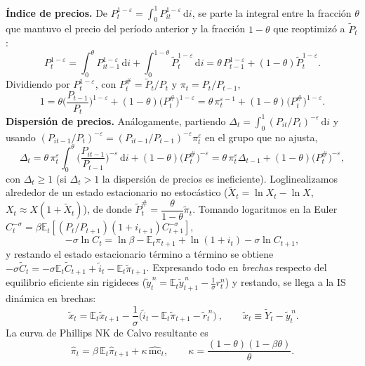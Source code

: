 \documentclass[11pt]{article}
\renewcommand{\boxed}[1]{#1}     %
\theoremstyle{definition}
\newcommand{\E}{\mathbb{E}}
\newcommand{\dd}{\,\mathrm{d}}
\newcommand{\mc}{\mathrm{mc}}
\begin{document}
\textbf{Índice de precios.} De $P_{t}^{1-\varepsilon}=\int_{0}^{1}P_{it}^{1-\varepsilon}\dd i$, se parte la
integral entre la fracción $\theta$ que mantuvo el precio del período anterior y la fracción $1-\theta$
que reoptimizó a $\widetilde{P}_{t}$:
\begin{equation}
P_{t}^{1-\varepsilon}=\int_{0}^{\theta}P_{it-1}^{1-\varepsilon}\dd i+\int_{0}^{1-\theta}\widetilde{P}_{t}^{1-\varepsilon}\dd i
=\theta\,P_{t-1}^{1-\varepsilon}+(1-\theta)\widetilde{P}_{t}^{1-\varepsilon}.
\end{equation}
Dividiendo por $P_{t}^{1-\varepsilon}$, con $P_{t}^{\#}=\widetilde{P}_{t}/P_{t}$ y $\pi_{t}=P_{t}/P_{t-1}$,
\begin{equation}
1=\theta\Big(\frac{P_{t-1}}{P_{t}}\Big)^{1-\varepsilon}+(1-\theta)\big(P_{t}^{\#}\big)^{1-\varepsilon}
=\theta\,\pi_{t}^{\varepsilon-1}+(1-\theta)\big(P_{t}^{\#}\big)^{1-\varepsilon}.
\end{equation}
\textbf{Dispersión de precios.} Análogamente, partiendo
$\Delta_{t}=\int_{0}^{1}(P_{it}/P_{t})^{-\varepsilon}\dd i$ y usando
$(P_{it-1}/P_{t})^{-\varepsilon}=(P_{it-1}/P_{t-1})^{-\varepsilon}\pi_{t}^{\varepsilon}$ en el grupo que no ajusta,
\begin{equation}
\Delta_{t}=\theta\,\pi_{t}^{\varepsilon}\!\int_{0}^{\theta}\Big(\frac{P_{it-1}}{P_{t-1}}\Big)^{-\varepsilon}\dd i
+(1-\theta)\big(P_{t}^{\#}\big)^{-\varepsilon}
=\theta\,\pi_{t}^{\varepsilon}\Delta_{t-1}+(1-\theta)\big(P_{t}^{\#}\big)^{-\varepsilon},
\end{equation}
con $\Delta_{t}\ge1$ (si $\Delta_{t}>1$ la dispersión de precios es ineficiente).
Loglinealizamos alrededor de un estado estacionario no estocástico
($\widetilde{X}_{t}=\ln X_{t}-\ln X$, $X_{t}\approx X(1+\widetilde{X}_{t})$), de donde
$\widetilde{P}_{t}^{\#}=\dfrac{\theta}{1-\theta}\widetilde{\pi}_{t}$. Tomando logaritmos en la Euler
$C_{t}^{-\sigma}=\beta\E_{t}[(P_{t}/P_{t+1})(1+i_{t+1})C_{t+1}^{-\sigma}]$,
\begin{equation}
-\sigma\ln C_{t}=\ln\beta-\E_{t}\pi_{t+1}+\ln(1+i_{t})-\sigma\ln C_{t+1},
\end{equation}
y restando el estado estacionario término a término se obtiene
$-\sigma\widetilde{C}_{t}=-\sigma\E_{t}\widetilde{C}_{t+1}+\widetilde{i}_{t}-\E_{t}\widetilde{\pi}_{t+1}$.
Expresando todo en \emph{brechas} respecto del equilibrio eficiente sin rigideces
($\widetilde{y}_{t}^{\,n}=\E_{t}\widetilde{y}_{t+1}^{\,n}-\tfrac{1}{\sigma}r_{t}^{n}$) y restando, se
llega a la IS dinámica en brechas:
\begin{equation}
\boxed{\ \widetilde{x}_{t}=\E_{t}\widetilde{x}_{t+1}-\frac{1}{\sigma}\big(\widetilde{i}_{t}-\E_{t}\widetilde{\pi}_{t+1}-\widetilde{r}_{t}^{\,n}\big)\ },
\qquad
\widetilde{x}_{t}\equiv\widetilde{Y}_{t}-\widetilde{y}_{t}^{\,n}.
\end{equation}
La curva de Phillips NK de Calvo resultante es
\begin{equation}
\widehat{\pi}_{t}=\beta\,\E_{t}\widehat{\pi}_{t+1}+\kappa\,\widehat{\mc}_{t},
\qquad
\kappa=\frac{(1-\theta)(1-\beta\theta)}{\theta}.
\end{equation}
\end{document}
